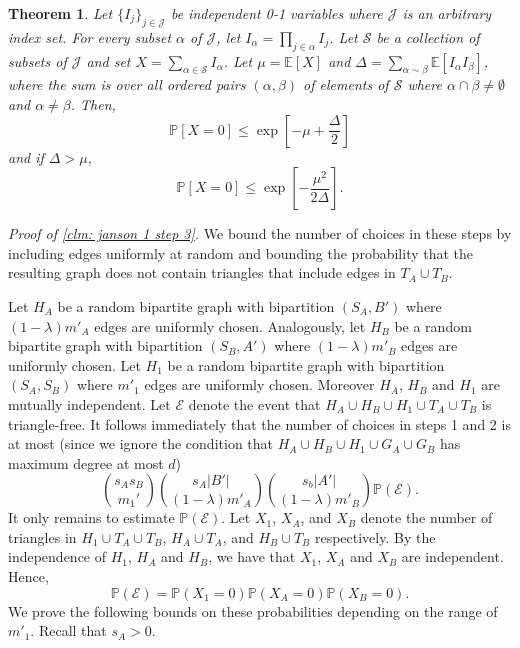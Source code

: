 \documentclass[11pt]{article}
\def\P{\mathbb P}
\theoremstyle{plain}
\newtheorem{thm}{Theorem}[section]
\begin{document}
\begin{thm}\label{thm: Janson}\cite{janson1988exponential}
    Let $\{I_j\}_{j \in \mathcal J}$ be independent 0-1 variables where $\mathcal J$ is an arbitrary index set. For every subset $\alpha$ of $\mathcal J$, let $I_\alpha = \prod_{j \in \alpha}I_j$. Let $\mathcal S$ be a collection of subsets of $\mathcal J$ and set $X = \sum_{\alpha \in \mathcal S}I_\alpha$. Let $\mu = \mathbb E[X]$ and $\Delta = \sum_{\alpha \sim \beta} \mathbb E[I_\alpha I_\beta]$, where the sum is over all ordered pairs $(\alpha, \beta)$ of elements of $\mathcal S$ where $\alpha \cap \beta \neq \emptyset$ and $\alpha \neq \beta$. Then,
\begin{equation}\label{eq: Janson 1}
    \mathbb P[X = 0] \leq \exp\left[ -\mu + \frac{\Delta}{2} \right]
\end{equation}
and if $\Delta > \mu$, 
\begin{equation}\label{eq: Janson 2}
    \mathbb P[X = 0] \leq \exp\left[ -\frac{\mu^2}{2\Delta} \right].
\end{equation}
\end{thm}
\medskip
\noindent\textit{Proof of \cref{clm: janson 1 step 3}.}
We bound the number of choices in these steps by including edges uniformly at random and bounding the probability that the resulting graph does not contain triangles that include edges in $T_A \cup T_B$. 

Let $H_A$ be a random bipartite graph with bipartition $(S_A, B')$ where $(1 - \lambda )m'_A$ edges are uniformly chosen.  Analogously, let  $H_B$ be a random bipartite graph with bipartition $(S_B, A')$ where $(1 - \lambda )m'_B$ edges are uniformly chosen. Let  $H_1$ be a random bipartite graph with bipartition $(S_A, S_B)$ where $m'_1$ edges are uniformly chosen. Moreover $H_A$, $H_B$ and $H_1$ are mutually independent. 
Let ${\mathcal E}$ denote the event that $H_A\cup H_B\cup H_1\cup T_A\cup T_B$ is triangle-free. It follows immediately that the number of choices in steps 1 and 2 is at most (since we ignore the condition that $H_A\cup H_B\cup H_1\cup G_A\cup G_B$ has maximum degree at most $d$)
\[
\binom{s_As_B}{m_1'}\binom{s_A|B'|}{(1 - \lambda )m'_A}\binom{s_b|A'|}{(1-\lambda )m'_B}\P({\mathcal E}).
\]
It only remains to estimate $\P({\mathcal E})$. Let $X_1$, $X_A$, and $X_B$ denote the number of triangles in $H_1 \cup T_A \cup T_B$, $H_A \cup T_A$, and $H_B \cup T_B$ respectively. By the independence of $H_1$, $H_A$ and $H_B$, we have that $X_1$, $X_A$ and $X_B$ are independent. Hence,
\[
\P({\mathcal E})=\P(X_1=0)\P(X_A=0)\P(X_B=0).
\]
We prove the following bounds on these probabilities depending on the range of $m'_1$. Recall that $s_A > 0$.
\end{document}
